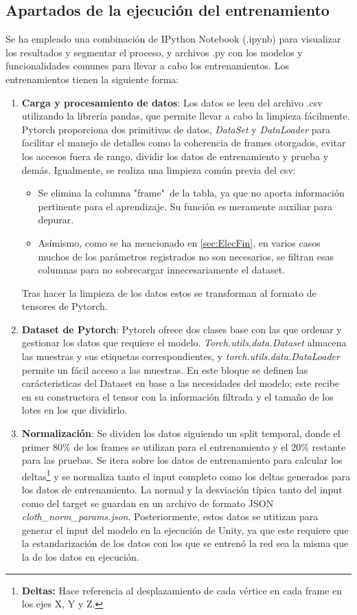 \subsection{Apartados de la ejecución del entrenamiento}
 Se ha empleado una combinación de IPython Notebook (.ipynb) para visualizar los resultados y segmentar el proceso, y archivos .py con los modelos y funcionalidades comunes para llevar a cabo los entrenamientos. Los entrenamientos tienen la siguiente forma:
\begin{enumerate}

    \item \textbf{Carga y procesamiento de datos}: 
    Los datos se leen del archivo .csv utilizando la librería pandas, que permite llevar a cabo la limpieza fácilmente. Pytorch proporciona dos primitivas de datos, \textit{DataSet} y \textit{DataLoader} para facilitar el manejo de detalles como la coherencia de frames otorgados, evitar los accesos fuera de rango, dividir los datos de entrenamiento y prueba y demás. Igualmente, se realiza una limpieza común previa del csv:
    \begin{itemize}
        \item Se elimina la columna "frame"\ de la tabla, ya que no aporta información pertinente para el aprendizaje. Su función es meramente auxiliar para depurar.
        \item Asímismo, como se ha mencionado en \ref{sec:ElecFin}, en varios casos muchos de los parámetros registrados no son necesarios, se filtran esas columnas para no sobrecargar innecesariamente el dataset.
    \end{itemize}
    Tras hacer la limpieza de los datos estos se transforman al formato de tensores de Pytorch. 

    \item \textbf{Dataset de Pytorch}: Pytorch ofrece dos clases base con las que ordenar y gestionar los datos que requiere el modelo. \textit{Torch.utils.data.Dataset} almacena las muestras y sus etiquetas correspondientes, y \textit{torch.utils.data.DataLoader} permite un fácil acceso a las muestras. En este bloque se definen las carácteristicas del Dataset en base a las necesidades del modelo; este recibe en su constructora el tensor con la información filtrada y el tamaño de los lotes en los que dividirlo.

    \item \textbf{Normalización}: Se dividen los datos siguiendo un split temporal, donde el primer 80\% de los frames se utilizan para el entrenamiento y el 20\% restante para las pruebas. Se itera sobre los datos de entrenamiento para calcular los deltas\footnote{\textbf{Deltas:} Hace referencia al desplazamiento de cada vértice en cada frame en los ejes X, Y y Z.} y se normaliza tanto el input completo como los deltas generados para los datos de entrenamiento. La normal y la desviación típica tanto del input como del target se guardan en un archivo de formato JSON \textit{cloth\_norm\_params.json}. Posteriormente, estos datos se utitizan para generar el input del modelo en la ejecución de Unity, ya que este requiere que la estandarización de los datos con los que se entrenó la red sea la misma que la de los datos en ejecución.


\end{enumerate}

